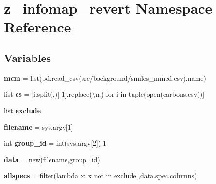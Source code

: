 \hypertarget{namespacez__infomap__revert}{}\section{z\+\_\+infomap\+\_\+revert Namespace Reference}
\label{namespacez__infomap__revert}
\subsection*{Variables}
\begin{DoxyCompactItemize}
\item 
\mbox{\label{namespacez__infomap__revert_af3e8e8bdaf06738e404a9f531baa05bd}} 
{\bfseries mcm} = list(pd.\+read\+\_\+csv(\textquotesingle{}src/background/smiles\+\_\+mined.\+csv\textquotesingle{}).name)
\item 
\mbox{\label{namespacez__infomap__revert_a8ce6e864c2e1a72db7cbb716ad1bfd1f}} 
list {\bfseries cs} = \mbox{[}i.\+split(\textquotesingle{},\textquotesingle{})\mbox{[}-\/1\mbox{]}.replace(\textquotesingle{}\textbackslash{}n\textquotesingle{},\textquotesingle{}\textquotesingle{}) for i in tuple(open(\textquotesingle{}carbons.\+csv\textquotesingle{}))\mbox{]}
\item 
list {\bfseries exclude}
\item 
\mbox{\label{namespacez__infomap__revert_a2205a50a4a651eac2c3a48097d3f5bf9}} 
{\bfseries filename} = sys.\+argv\mbox{[}1\mbox{]}
\item 
\mbox{\label{namespacez__infomap__revert_a34b8f073044fbe3e464ac8c75254ccdc}} 
int {\bfseries group\+\_\+id} = int(sys.\+argv\mbox{[}2\mbox{]})-\/1
\item 
\mbox{\label{namespacez__infomap__revert_a91f0b991bd4fa8ff35dcdde1c8bb5c3c}} 
{\bfseries data} = \mbox{\hyperlink{classzhdf_1_1new}{new}}(filename,group\+\_\+id)
\item 
\mbox{\label{namespacez__infomap__revert_a7c582f7b2b581ec74d2ecfb79493ef6d}} 
{\bfseries allspecs} = filter(lambda x\+: x not in exclude ,data.\+spec.\+columns)
\item 

\end{DoxyCompactItemize}
